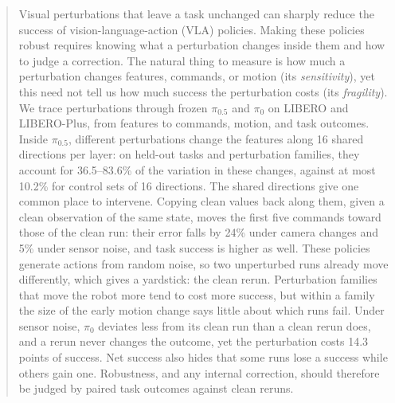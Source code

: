 \begin{abstract}
Visual perturbations that leave a task unchanged can sharply reduce the success of vision-language-action (VLA) policies. Making these policies robust requires knowing what a perturbation changes inside them and how to judge a correction. The natural thing to measure is how much a perturbation changes features, commands, or motion (its \emph{sensitivity}), yet this need not tell us how much success the perturbation costs (its \emph{fragility}). We trace perturbations through frozen $\pi_{0.5}$ and $\pi_0$ on LIBERO and LIBERO-Plus, from features to commands, motion, and task outcomes. Inside $\pi_{0.5}$, different perturbations change the features along 16 shared directions per layer: on held-out tasks and perturbation families, they account for 36.5--83.6\% of the variation in these changes, against at most 10.2\% for control sets of 16 directions. The shared directions give one common place to intervene. Copying clean values back along them, given a clean observation of the same state, moves the first five commands toward those of the clean run: their error falls by 24\% under camera changes and 5\% under sensor noise, and task success is higher as well. These policies generate actions from random noise, so two unperturbed runs already move differently, which gives a yardstick: the clean rerun. Perturbation families that move the robot more tend to cost more success, but within a family the size of the early motion change says little about which runs fail. Under sensor noise, $\pi_0$ deviates less from its clean run than a clean rerun does, and a rerun never changes the outcome, yet the perturbation costs 14.3 points of success. Net success also hides that some runs lose a success while others gain one. Robustness, and any internal correction, should therefore be judged by paired task outcomes against clean reruns.
\end{abstract}
